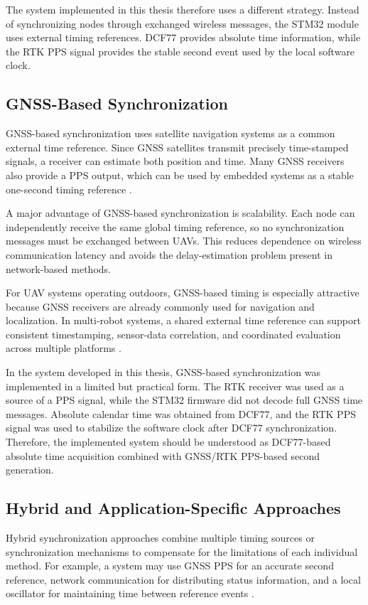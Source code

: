 The system implemented in this thesis therefore uses a different strategy. Instead of synchronizing nodes through exchanged wireless messages, the STM32 module uses external timing references. DCF77 provides absolute time information, while the RTK PPS signal provides the stable second event used by the local software clock.

\subsection{GNSS-Based Synchronization}

GNSS-based synchronization uses satellite navigation systems as a common external time reference. Since GNSS satellites transmit precisely time-stamped signals, a receiver can estimate both position and time. Many GNSS receivers also provide a PPS output, which can be used by embedded systems as a stable one-second timing reference \cite{teunissen2017springer}.

A major advantage of GNSS-based synchronization is scalability. Each node can independently receive the same global timing reference, so no synchronization messages must be exchanged between UAVs. This reduces dependence on wireless communication latency and avoids the delay-estimation problem present in network-based methods.

For UAV systems operating outdoors, GNSS-based timing is especially attractive because GNSS receivers are already commonly used for navigation and localization. In multi-robot systems, a shared external time reference can support consistent timestamping, sensor-data correlation, and coordinated evaluation across multiple platforms \cite{r6}.

In the system developed in this thesis, GNSS-based synchronization was implemented in a limited but practical form. The RTK receiver was used as a source of a PPS signal, while the STM32 firmware did not decode full GNSS time messages. Absolute calendar time was obtained from DCF77, and the RTK PPS signal was used to stabilize the software clock after DCF77 synchronization. Therefore, the implemented system should be understood as DCF77-based absolute time acquisition combined with GNSS/RTK PPS-based second generation.

\subsection{Hybrid and Application-Specific Approaches}

Hybrid synchronization approaches combine multiple timing sources or synchronization mechanisms to compensate for the limitations of each individual method. For example, a system may use GNSS PPS for an accurate second reference, network communication for distributing status information, and a local oscillator for maintaining time between reference events \cite{teunissen2017springer,kopetz2011realtime}.


